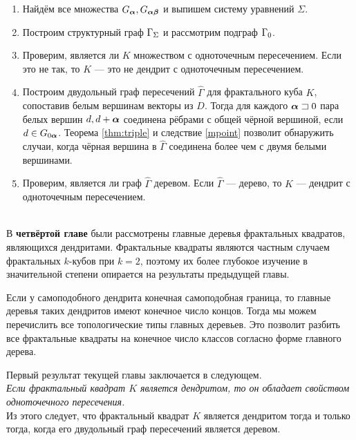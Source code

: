 \begin{enumerate}[nolistsep]

\item Найдём все множества $G_{\bm{\alpha}}, G_{{\bm{\alpha}}{\bm{\beta}}}$ и выпишем систему уравнений $\Sigma$.

\item Построим структурный граф $\Gamma_\Sigma$ и рассмотрим подграф $\Gamma_0$.
 
\item Проверим, является ли $K$ множеством с одноточечным пересечением.
Если это не так, то $K$ --- это не дендрит с одноточечным пересечением.
    
\item Построим двудольный граф пересечений $\hat\Gamma$ для фрактального куба $K$, сопоставив белым вершинам векторы из $D$.
Тогда для каждого ${\bm{\alpha}}\sqsupset0$ пара белых вершин $d, d+{\bm{\alpha}}$ соединена рёбрами с общей чёрной вершиной, если $d\in G_{0{\bm{\alpha}}}$.
Теорема \ref{thm:triple} и следствие \ref{mpoint} позволит обнаружить случаи, когда чёрная вершина в $\hat\Gamma$ соединена более чем с двумя белыми вершинами.

\item Проверим, является ли граф $\hat\Gamma$ деревом.
Если $\hat\Gamma$ --- дерево, то $K$ --- дендрит с одноточечным пересечением.    
\end{enumerate}\quad\\



В {\bf четвёртой главе} были рассмотрены главные деревья фрактальных квадратов, являющихся дендритами.
Фрактальные квадраты являются частным случаем фрактальных $k$-кубов при $k=2$, поэтому их более глубокое изучение в значительной степени опирается на результаты предыдущей главы.

Если у самоподобного дендрита конечная самоподобная граница, то главные деревья таких дендритов имеют конечное число концов.
Тогда мы можем перечислить все топологические типы главных деревьев.
Это позволит разбить все фрактальные квадраты на конечное число классов согласно форме главного дерева.

Первый результат текущей главы заключается в следующем.\\

{\em Если фрактальный квадрат $K$ является дендритом, то он обладает свойством одноточечного пересечения.}\\

Из этого следует, что фрактальный квадрат $K$ является дендритом тогда и только тогда, когда его двудольный граф пересечений является деревом.\\
 
